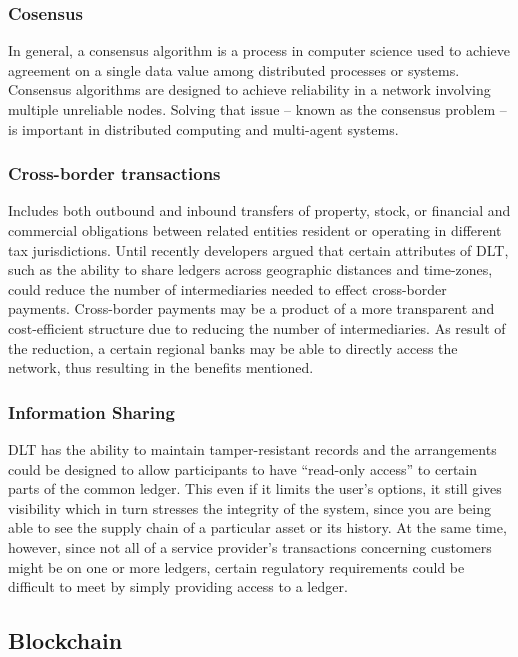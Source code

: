 \documentclass[a4paper,11pt]{report}
\begin{document}
\subsubsection{Cosensus}  
\label{consensus}

In general, a consensus algorithm is a process in computer science used to achieve agreement on a single data value among distributed processes or systems. Consensus algorithms are designed to achieve reliability in a network involving multiple unreliable nodes. Solving that issue – known as the consensus problem – is important in distributed computing and multi-agent systems.\cite{mills2016distributed}
\subsubsection{Cross-border transactions}  
\label{xborderTransactions}

Includes both outbound and inbound transfers of property, stock, or financial and commercial obligations between related entities resident or operating in different tax jurisdictions. Until recently developers argued that certain attributes of DLT, such as the ability to share ledgers across geographic distances and time-zones, could reduce the number of intermediaries needed to effect cross-border payments. Cross-border payments may be a product of a more transparent and cost-efficient structure due to reducing the number of intermediaries. As result of the reduction, a certain regional banks may be able to directly access the network, thus resulting in the benefits mentioned.\cite{mills2016distributed}


\subsubsection{Information Sharing}  
\label{infosharing}
DLT has the ability to maintain tamper-resistant records and the arrangements could be designed to allow participants to have “read-only access” to certain parts of the common ledger. This even if it limits the user’s options, it still gives visibility which in turn stresses the integrity of the system, since you are being able to see the supply chain of a particular asset or its history. At the same time, however, since not all of a service provider’s transactions concerning customers might be on one or more ledgers, certain regulatory requirements could be difficult to meet by simply providing access to a ledger.\cite{mills2016distributed}

\subsection{Blockchain}
\label{blockchain}
\end{document}
